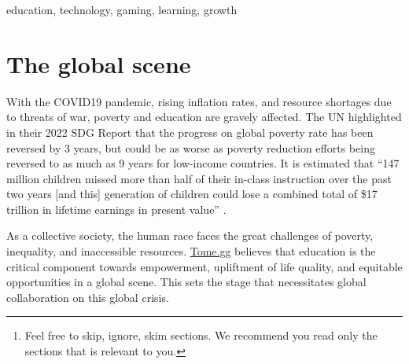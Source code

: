 \documentclass[conference]{IEEEtran}
\newcommand{\tomegg}{
  \href{http://tome.gg}{Tome.gg}
}
\begin{document}
\begin{abstract}
This whitepaper carves out the \tomegg's contribution to inclusive and equitable
quality education and lifelong learning for all\footnote[1]{Feel free to skip, ignore, skim sections. We recommend you read only 
the sections that is relevant to you.}. 

In section \ref{sec:global_scene}, we quantify the gravity of the challenge that
the community faces at a global scale.
In section \ref{sec:introduction}, we introduce Tome.gg and its general concept.
In section \ref{sec:stakeholders}, we describe the different 
stakeholders within and adjacent to the community.
In section \ref{sec:problems_challenges}, we define the problems and challenges 
we are aiming to address.
In section \ref{sec:contribution}, we propose theories and recommendations
to address said problems to guide the community's effort in contribution.

The remaining sections \ref{sec:principles_mindsets} and \ref{sec:community_directions}
define our community principles and directions that lay the groundwork
for the active projects within the community. After reading this whitepaper, you will have a clear idea of who we are, what we
are trying to solve, and the spaces in our community that you can go: to lurk, 
participate, play, learn, teach, or create.
\end{abstract}

\begin{IEEEkeywords}
education, technology, gaming, learning, growth
\end{IEEEkeywords}

\section{The global scene}
\label{sec:global_scene}
With the COVID19 pandemic, rising inflation rates, and resource shortages due to 
threats of war, poverty and education are gravely affected.
The UN highlighted in their 2022 SDG Report \cite{b1} that the progress on global poverty rate has been reversed by
3 years, but could be as worse as poverty reduction efforts being reversed to 
as much as 9 years for low-income countries\cite{b2}. It is estimated that 
``147 million children missed more than half of their in-class instruction over 
the past two years [and this] generation of children could lose a combined total of 
\$17 trillion in lifetime earnings in present value'' \cite{b3}.

As a collective society, the human race faces the great challenges of poverty, 
inequality, and inaccessible resources. \tomegg believes that education is the
critical component towards empowerment, upliftment of life quality, and 
equitable opportunities in a global scene. This sets the stage that necessitates
global collaboration on this global crisis. 
\end{document}
